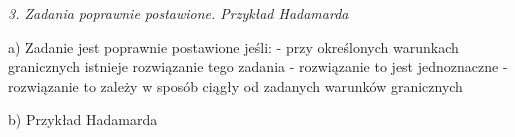 \textit{3. Zadania poprawnie postawione. Przykład Hadamarda}

a) Zadanie jest poprawnie postawione jeśli:
  - przy określonych warunkach granicznych istnieje rozwiązanie tego zadania
  - rozwiązanie to jest jednoznaczne
  - rozwiązanie to zależy w sposób ciągły od zadanych warunków granicznych

b) Przykład Hadamarda


